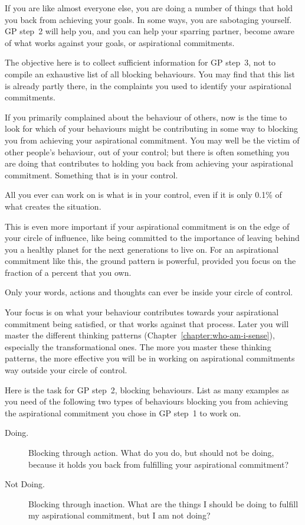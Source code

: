 If you are like almost everyone else, you are doing a number of things that hold you back from achieving your goals. In some ways, you are sabotaging yourself. GP step~2 will help you, and you can help your sparring partner, become aware of what works against your goals, or aspirational commitments. 


The objective here is to collect sufficient information for GP step~3, not to compile an exhaustive list of all blocking behaviours. You may find that this list is already partly there, in the complaints you used to identify your aspirational commitments.


If you primarily complained about the behaviour of others, now is the time to look for which of your behaviours might be contributing in some way to blocking you from achieving your aspirational commitment. You may well be the victim of other people’s behaviour, out of your control; but there is often something you are doing that contributes to holding you back from achieving your aspirational commitment. Something that is in your control. 


All you ever can work on is what is in your control, even if it is only 0.1\% of what creates the situation.


This is even more important if your aspirational commitment is on the edge of your circle of influence, like being committed to the importance of leaving behind you a healthy planet for the next generations to live on. For an aspirational commitment like this, the ground pattern is powerful, provided you focus on the fraction of a percent that you own. 


Only your words, actions and thoughts can ever be inside your circle of control. 


Your focus is on what your behaviour contributes towards your aspirational commitment being satisfied, or that works against that process. Later you will master the different thinking patterns (Chapter~\ref{chapter:who-am-i-sense}), especially the transformational ones. The more you master these thinking patterns, the more effective you will be in working on aspirational commitments way outside your circle of control.


Here is the task for GP step~2, blocking behaviours. List as many examples as you need of the following two types of behaviours blocking you from achieving the aspirational commitment you chose in GP step~1 to work on. 


\begin{description}
\item[Doing.] Blocking through action. What do you do, but should not be doing, because it holds you back from fulfilling your aspirational commitment?
\item[Not Doing.] Blocking through inaction. What are the things I should be doing to fulfill my aspirational commitment, but I am not doing?
\end{description}


